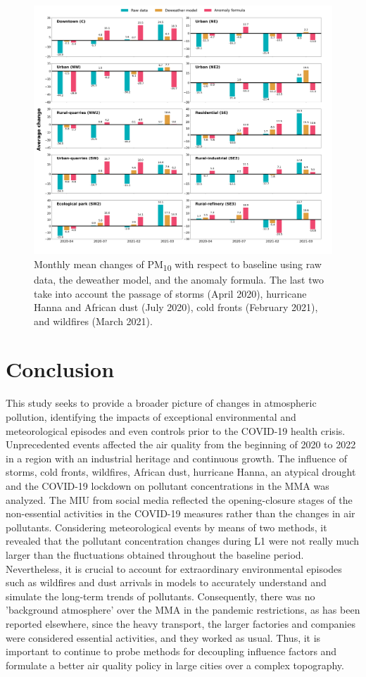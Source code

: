 \documentclass[preprint,12pt]{elsarticle}
\begin{document}
\begin{figure}[ht!]
	\centering
	\includegraphics[width=\linewidth]{figures/average_change_deweather_fourier.png}
	\caption{Monthly mean changes of PM\textsubscript{10} with respect to baseline using raw data, the deweather model, and the anomaly formula. The last two take into account the passage of storms (April 2020), hurricane Hanna and African dust (July 2020), cold fronts (February 2021), and wildfires (March 2021).
	}
	\label{fig:average_change_deweather_fourier}
\end{figure}
\section*{Conclusion}
This study seeks to provide a broader picture of changes in atmospheric pollution, identifying the impacts of exceptional environmental and meteorological episodes and even controls prior to the COVID-19 health crisis. Unprecedented events affected the air quality from the beginning of 2020 to 2022 in a region with an industrial heritage and continuous growth. The influence of storms, cold fronts, wildfires, African dust, hurricane Hanna, an atypical drought and the COVID-19 lockdown on pollutant concentrations in the MMA was analyzed. The MIU from social media reflected the opening-closure stages of the non-essential activities in the COVID-19 measures rather than the changes in air pollutants.  Considering meteorological events by means of two methods, it revealed that the pollutant concentration changes during L1 were not really much larger than the fluctuations obtained throughout the baseline period. Nevertheless, it is crucial to account for extraordinary environmental episodes such as wildfires and dust arrivals in models to accurately understand and simulate the long-term trends of pollutants. Consequently, there was no 'background atmosphere' over the MMA in the pandemic restrictions, as has been reported elsewhere, since the heavy transport, the larger factories and companies were considered essential activities, and they worked as usual. Thus, it is important to continue to probe methods for decoupling influence factors and formulate a better air quality policy in large cities over a complex topography.
\end{document}
